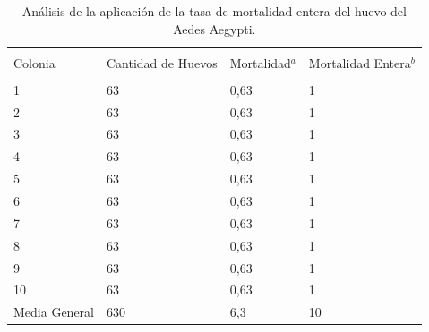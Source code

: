 \begin{table}
    \begin{minipage}{\textwidth}
        \caption{ \label{tab:mortalidad-huevo-error} Análisis de la aplicación de la tasa de mortalidad entera del huevo del Aedes Aegypti.}

        \begin{tabular}{p{4cm} p{4cm} p{3cm} l }
                    \hline \\
                    Colonia & Cantidad de Huevos & Mortalidad$^{a}$ & Mortalidad Entera$^{b}$\\
                    \hline
                    \hline \\

                    1       & 63  & 0,63 & 1\\
                    2       & 63  & 0,63 & 1\\
                    3       & 63  & 0,63 & 1\\
                    4       & 63  & 0,63 & 1\\
                    5       & 63  & 0,63 & 1\\
                    6       & 63  & 0,63 & 1\\
                    7       & 63  & 0,63 & 1\\
                    8       & 63  & 0,63 & 1\\
                    9       & 63  & 0,63 & 1\\
                    10      & 63  & 0,63 & 1\\
                    Media General  & 630 & 6,3 & 10\\

        \end{tabular}
    \end{minipage}
\end{table}
